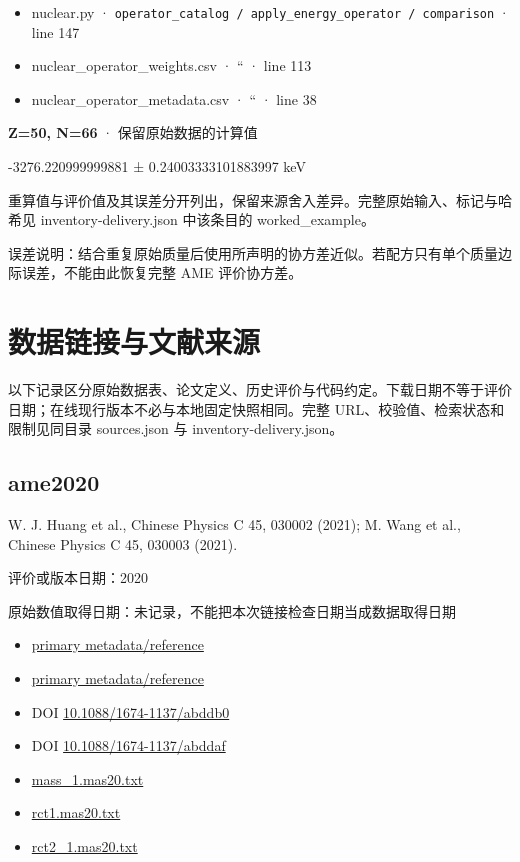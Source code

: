 \documentclass[
  11pt,
  letterpaper,
]{article}
\providecommand{\tightlist}{%
  \setlength{\itemsep}{0pt}\setlength{\parskip}{0pt}}
\begin{document}
\begin{itemize}
\tightlist
\item
  nuclear.py ·
  \texttt{operator\_catalog\ /\ apply\_energy\_operator\ /\ comparison}
  · line 147
\item
  nuclear\_operator\_weights.csv · `` · line 113
\item
  nuclear\_operator\_metadata.csv · `` · line 38
\end{itemize}

\textbf{Z=50, N=66} · 保留原始数据的计算值

-3276.220999999881 ± 0.24003333101883997 keV

重算值与评价值及其误差分开列出，保留来源舍入差异。完整原始输入、标记与哈希见
inventory-delivery.json 中该条目的 worked\_example。

误差说明：结合重复原始质量后使用所声明的协方差近似。若配方只有单个质量边际误差，不能由此恢复完整
AME 评价协方差。

\section{数据链接与文献来源}\label{ux6570ux636eux94feux63a5ux4e0eux6587ux732eux6765ux6e90}

以下记录区分原始数据表、论文定义、历史评价与代码约定。下载日期不等于评价日期；在线现行版本不必与本地固定快照相同。完整
URL、校验值、检索状态和限制见同目录 sources.json 与
inventory-delivery.json。

\subsection{ame2020}\label{ame2020}

W. J. Huang et al., Chinese Physics C 45, 030002 (2021); M. Wang et al.,
Chinese Physics C 45, 030003 (2021).

评价或版本日期：2020

原始数值取得日期：未记录，不能把本次链接检查日期当成数据取得日期

\begin{itemize}
\tightlist
\item
  \href{https://www-nds.iaea.org/amdc/}{primary metadata/reference}
\item
  \href{https://cpc.ihep.ac.cn/article/doi/10.1088/1674-1137/abddaf}{primary
  metadata/reference}
\item
  DOI
  \href{https://doi.org/10.1088/1674-1137/abddb0}{10.1088/1674-1137/abddb0}
\item
  DOI
  \href{https://doi.org/10.1088/1674-1137/abddaf}{10.1088/1674-1137/abddaf}
\item
  \href{https://www-nds.iaea.org/amdc/ame2020/mass_1.mas20.txt}{mass\_1.mas20.txt}
\item
  \href{https://www-nds.iaea.org/amdc/ame2020/rct1.mas20.txt}{rct1.mas20.txt}
\item
  \href{https://www-nds.iaea.org/amdc/ame2020/rct2_1.mas20.txt}{rct2\_1.mas20.txt}
\end{itemize}
\end{document}
